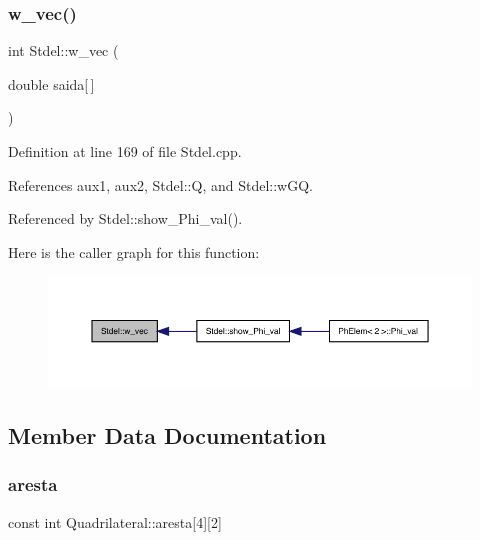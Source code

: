 \subsubsection{\texorpdfstring{w\+\_\+vec()}{w\_vec()}}
{\footnotesize\ttfamily int Stdel\+::w\+\_\+vec (\begin{DoxyParamCaption}\item[{double}]{saida\mbox{[}$\,$\mbox{]} }\end{DoxyParamCaption})\hspace{0.3cm}{\ttfamily [inherited]}}



Definition at line 169 of file Stdel.\+cpp.



References aux1, aux2, Stdel\+::Q, and Stdel\+::w\+GQ.



Referenced by Stdel\+::show\+\_\+\+Phi\+\_\+val().

Here is the caller graph for this function\+:
\nopagebreak
\begin{figure}[H]
\begin{center}
\leavevmode
\includegraphics[width=350pt]{classStdel_a395c8d7d7890a9efdea23932fa22b420_icgraph}
\end{center}
\end{figure}


\subsection{Member Data Documentation}
\mbox{\label{classQuadrilateral_a0d3d9601b47ed4d19d6b85a94b8a460f}} 
\subsubsection{\texorpdfstring{aresta}{aresta}}
{\footnotesize\ttfamily const int Quadrilateral\+::aresta\mbox{[}4\mbox{]}\mbox{[}2\mbox{]}\hspace{0.3cm}{\ttfamily [private]}}


